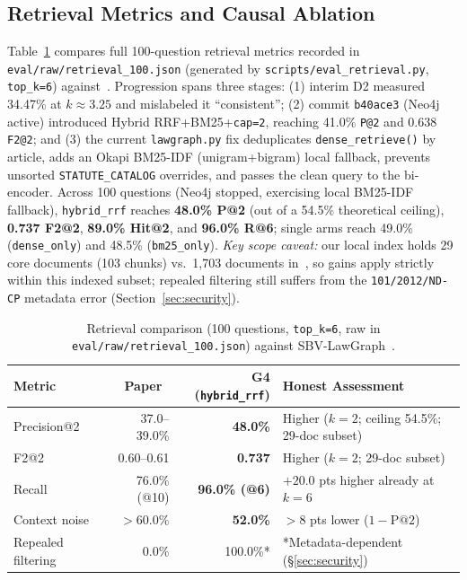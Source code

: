 \documentclass[sigconf,nonacm]{acmart}
\begin{document}
\subsection{Retrieval Metrics and Causal Ablation}
Table~\ref{tab:retrieval} compares full 100-question retrieval metrics recorded in \texttt{eval/raw/retrieval\_100.json} (generated by \texttt{scripts/eval\_retrieval.py}, \texttt{top\_k=6}) against~\cite{phan2026sbv}. Progression spans three stages: (1) interim D2 measured 34.47\% at $k \approx 3.25$ and mislabeled it ``consistent''; (2) commit \texttt{b40ace3} (Neo4j active) introduced Hybrid RRF+BM25+\texttt{cap=2}, reaching 41.0\% \texttt{P@2} and 0.638 \texttt{F2@2}; and (3) the current \texttt{lawgraph.py} fix deduplicates \texttt{dense\_retrieve()} by article, adds an Okapi BM25-IDF (unigram+bigram) local fallback, prevents unsorted \texttt{STATUTE\_CATALOG} overrides, and passes the clean query to the bi-encoder. Across 100 questions (Neo4j stopped, exercising local BM25-IDF fallback), \texttt{hybrid\_rrf} reaches \textbf{48.0\% P@2} (out of a 54.5\% theoretical ceiling), \textbf{0.737 F2@2}, \textbf{89.0\% Hit@2}, and \textbf{96.0\% R@6}; single arms reach 49.0\% (\texttt{dense\_only}) and 48.5\% (\texttt{bm25\_only}). \emph{Key scope caveat:} our local index holds 29 core documents (103 chunks) vs.\ 1,703 documents in~\cite{phan2026sbv}, so gains apply strictly within this indexed subset; repealed filtering still suffers from the \texttt{101/2012/ND-CP} metadata error (Section~\ref{sec:security}).

\begin{table}[t]
\caption{Retrieval comparison (100 questions, \texttt{top\_k=6}, raw in \texttt{eval/raw/retrieval\_100.json}) against SBV-LawGraph~\cite{phan2026sbv}.}
\label{tab:retrieval}
\scriptsize
\begin{tabular}{@{}lrrp{2.7cm}@{}}
\toprule
\textbf{Metric} & \textbf{Paper~\cite{phan2026sbv}} & \textbf{G4 (\texttt{hybrid\_rrf})} & \textbf{Honest Assessment} \\
\midrule
Precision@2 & 37.0--39.0\% & \textbf{48.0\%} & Higher ($k=2$; ceiling 54.5\%; 29-doc subset) \\
F2@2 & 0.60--0.61 & \textbf{0.737} & Higher ($k=2$; 29-doc subset) \\
Recall & 76.0\% (@10) & \textbf{96.0\% (@6)} & $+20.0$ pts higher already at $k=6$ \\
Context noise & $>60.0\%$ & \textbf{52.0\%} & $>8$ pts lower ($1 - \text{P@2}$) \\
Repealed filtering & 0.0\% & 100.0\%* & *Metadata-dependent (\S\ref{sec:security}) \\
\bottomrule
\end{tabular}
\end{table}
\end{document}
